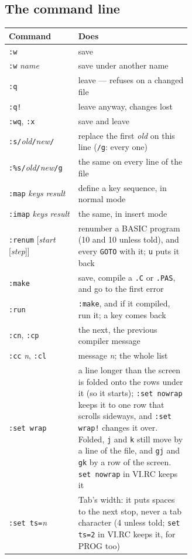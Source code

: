 \subsection*{The command line}
\begin{center}
\small
\begin{tabular}{@{}l >{\raggedright\arraybackslash}p{0.62\linewidth}@{}}
\toprule
\textbf{Command} & \textbf{Does} \\
\midrule
\texttt{:w} & save \\
\texttt{:w} \emph{name} & save under another name \\
\texttt{:q} & leave --- refuses on a changed file \\
\texttt{:q!} & leave anyway, changes lost \\
\texttt{:wq}, \texttt{:x} & save and leave \\
\texttt{:s/}\emph{old}\texttt{/}\emph{new}\texttt{/} & replace the first \emph{old} on this line (\texttt{/g}: every one) \\
\texttt{:\%s/}\emph{old}\texttt{/}\emph{new}\texttt{/g} & the same on every line of the file \\
\texttt{:map} \emph{keys} \emph{result} & define a key sequence, in normal mode \\
\texttt{:imap} \emph{keys} \emph{result} & the same, in insert mode \\
\texttt{:renum} [\emph{start} [\emph{step}]] & renumber a BASIC program (10 and 10 unless told), and every \texttt{GOTO} with it; \texttt{u} puts it back \\
\texttt{:make} & save, compile a \texttt{.C} or \texttt{.PAS}, and go to the first error \\
\texttt{:run} & \texttt{:make}, and if it compiled, run it; a key comes back \\
\texttt{:cn}, \texttt{:cp} & the next, the previous compiler message \\
\texttt{:cc} \emph{n}, \texttt{:cl} & message \emph{n}; the whole list \\
\texttt{:set wrap} & a line longer than the screen is folded onto the rows under it (so it starts); \texttt{:set nowrap} keeps it to one row that scrolls sideways, and \texttt{:set wrap!} changes it over. Folded, \texttt{j} and \texttt{k} still move by a line of the file, and \texttt{gj} and \texttt{gk} by a row of the screen. \texttt{set nowrap} in VI.RC keeps it \\
\texttt{:set ts=}\emph{n} & Tab's width: it puts spaces to the next stop, never a tab character (4 unless told; \texttt{set ts=2} in VI.RC keeps it, for PROG too) \\
\bottomrule
\end{tabular}
\end{center}

